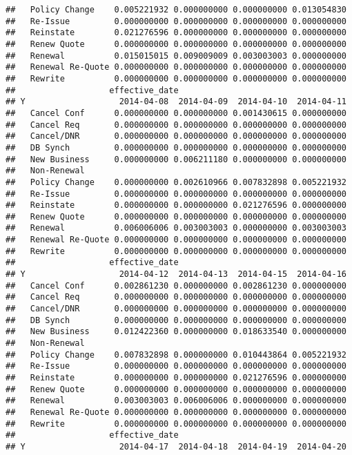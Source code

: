 \documentclass[]{article}
\begin{document}
\begin{verbatim}
##   Policy Change    0.005221932 0.000000000 0.000000000 0.013054830
##   Re-Issue         0.000000000 0.000000000 0.000000000 0.000000000
##   Reinstate        0.021276596 0.000000000 0.000000000 0.000000000
##   Renew Quote      0.000000000 0.000000000 0.000000000 0.000000000
##   Renewal          0.015015015 0.009009009 0.003003003 0.000000000
##   Renewal Re-Quote 0.000000000 0.000000000 0.000000000 0.000000000
##   Rewrite          0.000000000 0.000000000 0.000000000 0.000000000
##                   effective_date
## Y                   2014-04-08  2014-04-09  2014-04-10  2014-04-11
##   Cancel Conf      0.000000000 0.000000000 0.001430615 0.000000000
##   Cancel Req       0.000000000 0.000000000 0.000000000 0.000000000
##   Cancel/DNR       0.000000000 0.000000000 0.000000000 0.000000000
##   DB Synch         0.000000000 0.000000000 0.000000000 0.000000000
##   New Business     0.000000000 0.006211180 0.000000000 0.000000000
##   Non-Renewal                                                     
##   Policy Change    0.000000000 0.002610966 0.007832898 0.005221932
##   Re-Issue         0.000000000 0.000000000 0.000000000 0.000000000
##   Reinstate        0.000000000 0.000000000 0.021276596 0.000000000
##   Renew Quote      0.000000000 0.000000000 0.000000000 0.000000000
##   Renewal          0.006006006 0.003003003 0.000000000 0.003003003
##   Renewal Re-Quote 0.000000000 0.000000000 0.000000000 0.000000000
##   Rewrite          0.000000000 0.000000000 0.000000000 0.000000000
##                   effective_date
## Y                   2014-04-12  2014-04-13  2014-04-15  2014-04-16
##   Cancel Conf      0.002861230 0.000000000 0.002861230 0.000000000
##   Cancel Req       0.000000000 0.000000000 0.000000000 0.000000000
##   Cancel/DNR       0.000000000 0.000000000 0.000000000 0.000000000
##   DB Synch         0.000000000 0.000000000 0.000000000 0.000000000
##   New Business     0.012422360 0.000000000 0.018633540 0.000000000
##   Non-Renewal                                                     
##   Policy Change    0.007832898 0.000000000 0.010443864 0.005221932
##   Re-Issue         0.000000000 0.000000000 0.000000000 0.000000000
##   Reinstate        0.000000000 0.000000000 0.021276596 0.000000000
##   Renew Quote      0.000000000 0.000000000 0.000000000 0.000000000
##   Renewal          0.003003003 0.006006006 0.000000000 0.000000000
##   Renewal Re-Quote 0.000000000 0.000000000 0.000000000 0.000000000
##   Rewrite          0.000000000 0.000000000 0.000000000 0.000000000
##                   effective_date
## Y                   2014-04-17  2014-04-18  2014-04-19  2014-04-20

\end{verbatim}
\end{document}
